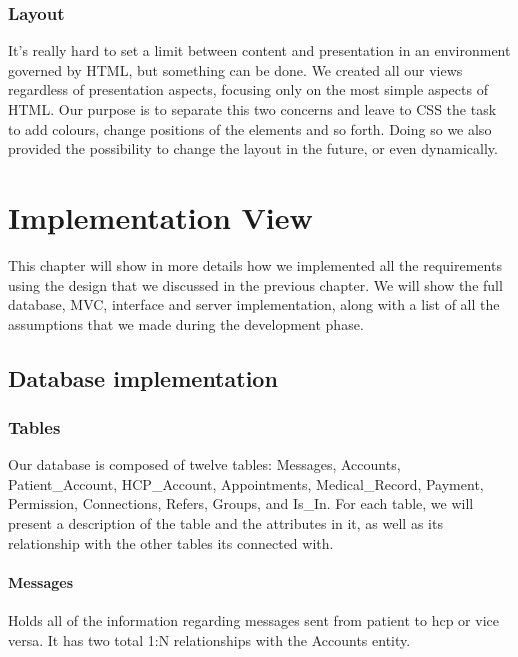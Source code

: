 \subsection{Layout}
It's really hard to set a limit between content and presentation in an environment governed by HTML, but something can be done. We created all our views regardless of presentation aspects, focusing only on the most simple aspects of HTML. Our purpose is to separate this two concerns and leave to CSS the task to add colours, change positions of the elements and so forth. Doing so we also provided the possibility to change the layout in the future, or even dynamically.



\chapter{Implementation View}
This chapter will show in more details how we implemented all the requirements using the design that we discussed in the previous chapter. We will show the full database, MVC, interface and server implementation, along with a list of all the assumptions that we made during the development phase.

\section{Database implementation}
\subsection{Tables}
Our database is composed of twelve tables: Messages, Accounts, Patient\_Account, HCP\_Account, Appointments, Medical\_Record, Payment, Permission, Connections, Refers, Groups, and Is\_In.  For each table, we will present a description of the table and the attributes in it, as well as its relationship with the other tables its connected with.

\subsubsection{Messages}
Holds all of the information regarding messages sent from patient to hcp or vice versa. It has two total 1:N relationships with the Accounts entity.

